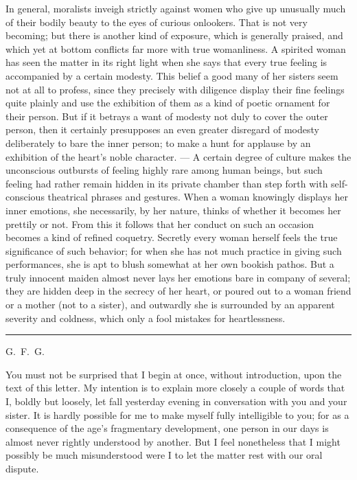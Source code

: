 \documentclass[12pt]{article}
\newcommand{\opage}[1]{\marginnote{\footnotesize\textit{[#1]}}}
\newcommand{\qvbreak}{\par\medskip\begin{center}\rule{0.32\textwidth}{0.4pt}\end{center}\medskip}
\begin{document}
In general, moralists inveigh strictly against women who give up unusually much of
their bodily beauty to the eyes of curious onlookers. That is not very becoming;
but there is another kind of exposure, which is generally praised, and which yet
at bottom conflicts far more with true womanliness. \opage{9}A spirited woman has
seen the matter in its right light when she says that every true feeling is
accompanied by a certain modesty. This belief a good many of her sisters seem not
at all to profess, since they precisely with diligence display their fine feelings
quite plainly and use the exhibition of them as a kind of poetic ornament for
their person. But if it betrays a want of modesty not duly to cover the outer
person, then it certainly presupposes an even greater disregard of modesty
deliberately to bare the inner person; to make a hunt for applause by an
exhibition of the heart's noble character. --- A certain degree of culture makes
the unconscious outbursts of feeling highly rare among human beings, but such
feeling had rather remain hidden in its private chamber than step forth with
self-conscious theatrical phrases and gestures. When a woman knowingly displays
her inner emotions, she necessarily, by her nature, thinks of whether it becomes
her prettily or not. From this it follows that her conduct on such an occasion
becomes a kind of refined coquetry. Secretly every woman herself feels the true
significance of such behavior; for when she has not much practice in giving such
performances, she is apt to blush somewhat at her own bookish pathos. But a truly
innocent maiden almost never lays her emotions bare in company of several; they
are hidden deep in the secrecy of her heart, or poured out to a woman friend or a
mother (not to a sister), and outwardly she is surrounded by an apparent severity
and coldness, which only a fool mistakes for heartlessness.

\qvbreak

\begin{center}\large G.~F.~G.\end{center}

You must not be surprised that I begin at once, without introduction, upon the
text of this letter. My intention is \opage{10}to explain more closely a couple of
words that I, boldly but loosely, let fall yesterday evening in conversation with
you and your sister. It is hardly possible for me to make myself fully intelligible
to you; for as a consequence of the age's fragmentary development, one person in
our days is almost never rightly understood by another. But I feel nonetheless
that I might possibly be much misunderstood were I to let the matter rest with our
oral dispute.
\end{document}
